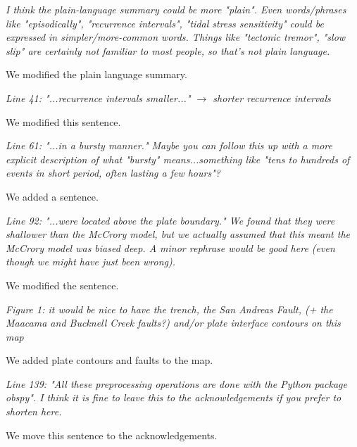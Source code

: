 \documentclass[letterpaper, 12pt]{article}
\begin{document}
\bigskip

\textit{I think the plain-language summary could be more "plain". Even words/phrases like "episodically", "recurrence intervals", "tidal stress sensitivity" could be expressed in  simpler/more-common words. Things like "tectonic tremor", "slow slip" are certainly not familiar to most people, so that's not plain language.}

\bigskip

We modified the plain language summary.

\bigskip

\textit{Line 41: "...recurrence intervals smaller..." $\rightarrow$ shorter recurrence intervals}

\bigskip

We modified this sentence.

\bigskip

\textit{Line 61: "...in a bursty manner." Maybe you can follow this up with a more explicit description of what "bursty" means...something like "tens to hundreds of events in short period, often lasting a few hours"?}

\bigskip

We added a sentence.

\bigskip

\textit{Line 92: "...were located above the plate boundary." We found that they were shallower than the McCrory model, but we actually assumed that this meant the McCrory model was biased deep. A minor rephrase would be good here (even though we might have just been wrong).}

\bigskip

We modified the sentence.

\bigskip

\textit{Figure 1: it would be nice to have the trench, the San Andreas Fault, (+ the Maacama and Bucknell Creek faults?) and/or plate interface contours on this map}

\bigskip

We added plate contours and faults to the map.

\bigskip

\textit{Line 139: "All these preprocessing operations are done with the Python package obspy". I think it is fine to leave this to the acknowledgements if you prefer to shorten here.}

\bigskip

We move this sentence to the acknowledgements.

\bigskip
\end{document}
